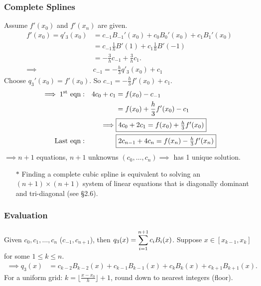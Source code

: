 \documentclass[]{article}
\begin{document}
\subsubsection*{Complete Splines}

Assume $f'(x_0)$ and $f'(x_n)$ are given.
\begin{align*}
	f'(x_0) = q'_3(x_0) &= c_{-1} B_{-1}'(x_0) + c_0 B_0'(x_0) + c_1 B_1'(x_0) \\
			  &= c_{-1} \frac1h B'(1) + c_1 \frac1h B'(-1) \\
			  &= -\frac3h c_{-1} + \frac3h c_1. \\
	\implies & c_{-1} = -\frac h3 q'_3(x_0) + c_1
\end{align*}
Choose $q_3'(x_0) = f'(x_0)$.
So \ul{$c_{-1} = -\frac h3 f'(x_0) + c_1$}.
\begin{align*}
	\implies 1^\text{st} \text{ eqn} &: & 4c_0 + c_1 &= f(x_0) - c_{-1} \\
									 &  & &= f(x_0) + \frac h3 f'(x_0) - c_1 \\
									 & & \implies & \fbox{$4c_0 + 2c_1 = f(x_0) + \frac h3 f'(x_0)$} \\
	\text{Last eqn} &: & & \fbox{$ 2c_{n-1} + 4c_n = f(x_n) - \frac h3 f'(x_n)$}
\end{align*}
$\implies n+1$ equations, $n+1$ unknowns $(c_0,\dots,c_n) \implies $ has 1 unique solution.
\begin{enumerate}
	\item[$*$] Finding a complete cubic spline is equivalent to solving an $(n+1)\times(n+1)$ system of linear equations that is diagonally dominant and tri-diagonal (see \S2.6).
\end{enumerate}

\subsubsection*{Evaluation}

Given $c_0,c_1,\dots,c_n$ ($c_{-1},c_{n+1}$), then $\displaystyle q_3(x) = \sum_{i=1}^{n+1} c_i B_i(x)$.
Suppose $x\in[x_{k-1},x_k]$ for some $1\leq k\leq n$.
\begin{align*}
	\implies q_3(x) &= c_{k-2} B_{k-2}(x) + c_{k-1} B_{k-1}(x) + c_kB_k(x) + c_{k+1}B_{k+1}(x).
\end{align*}
For a uniform grid: $k = \lfloor \frac{x-x_0}h \rfloor +1$, round down to nearest integers (floor).
\end{document}
